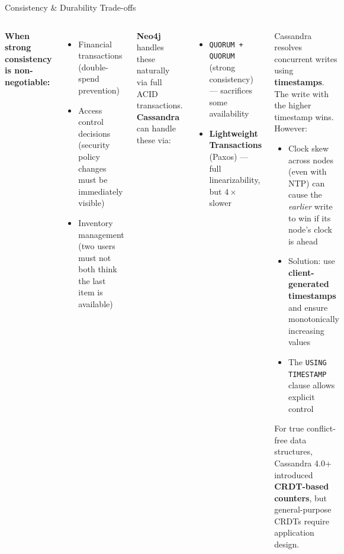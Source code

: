\documentclass[aspectratio=169]{beamer}
\begin{document}
\begin{frame}{Consistency \& Durability Trade-offs}
  \begin{columns}[T]
      \small
      \textbf{When strong consistency is non-negotiable:}
      \begin{itemize}
        \item Financial transactions (double-spend prevention)
        \item Access control decisions (security policy changes must be immediately visible)
        \item Inventory management (two users must not both think the last item is available)
      \end{itemize}
      \vspace{0.2cm}
      \textbf{Neo4j} handles these naturally via full ACID transactions.
      \vspace{0.2cm}
      \textbf{Cassandra} can handle these via:
      \begin{itemize}\scriptsize
        \item \texttt{QUORUM + QUORUM} (strong consistency) — sacrifices some availability
        \item \textbf{Lightweight Transactions} (Paxos) — full linearizability, but $4\times$ slower
      \end{itemize}
      \begin{tcolorbox}[deepdivebox, title={Deep Dive: Last-Write-Wins Conflicts}]
        \scriptsize
        Cassandra resolves concurrent writes using \textbf{timestamps}. The write with the higher timestamp wins. However:
        \begin{itemize}
          \item Clock skew across nodes (even with NTP) can cause the \textit{earlier} write to win if its node's clock is ahead
          \item Solution: use \textbf{client-generated timestamps} and ensure monotonically increasing values
          \item The \texttt{USING TIMESTAMP} clause allows explicit control
        \end{itemize}
        \vspace{0.1cm}
        For true conflict-free data structures, Cassandra 4.0+ introduced \textbf{CRDT-based counters}, but general-purpose CRDTs require application design.
      \end{tcolorbox}
  \end{columns}
\end{frame}
\end{document}
